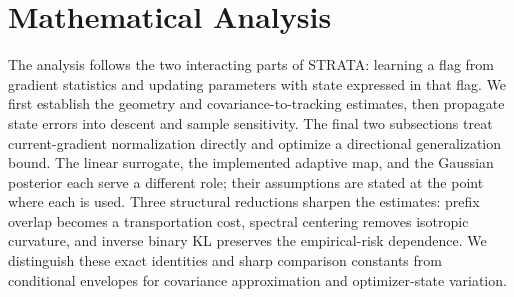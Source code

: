 \section{Mathematical Analysis}
\label{app:theory-full}
\providecommand{\tr}{\operatorname{tr}}
\providecommand{\sym}{\operatorname{sym}}
\providecommand{\skw}{\operatorname{skew}}
\providecommand{\diag}{\operatorname{diag}}
\providecommand{\blkdiag}{\operatorname{blkdiag}}
\providecommand{\St}{\operatorname{St}}
\providecommand{\Hor}{\mathcal H}
\providecommand{\Ver}{\mathcal V}
\providecommand{\EE}{\mathbb E}
\providecommand{\PP}{\mathbb P}
\providecommand{\RR}{\mathbb R}
\providecommand{\op}{\mathrm{op}}
\providecommand{\Id}{\mathrm{Id}}
\providecommand{\sgn}{\operatorname{sign}}
The analysis follows the two interacting parts of STRATA: learning a flag from
gradient statistics and updating parameters with state expressed in that flag.
We first establish the geometry and covariance-to-tracking estimates, then
propagate state errors into descent and sample sensitivity. The final two
subsections treat current-gradient normalization directly and optimize a
directional generalization bound. The linear surrogate, the implemented
adaptive map, and the Gaussian posterior each serve a different role; their
assumptions are stated at the point where each is used.
Three structural reductions sharpen the estimates: prefix overlap becomes a
transportation cost, spectral centering removes isotropic curvature, and
inverse binary KL preserves the empirical-risk dependence. We distinguish
these exact identities and sharp comparison constants from conditional
envelopes for covariance approximation and optimizer-state variation.












